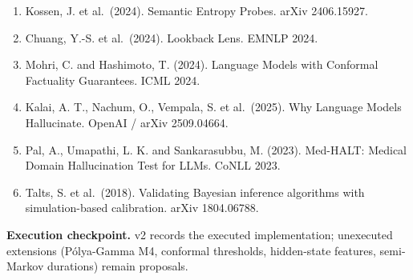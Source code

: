 \documentclass[11pt,letterpaper]{article}
\begin{document}
\begin{enumerate}[leftmargin=*]
\item Kossen, J. et al.\ (2024). Semantic Entropy Probes. arXiv 2406.15927.
\item Chuang, Y.-S. et al.\ (2024). Lookback Lens. EMNLP 2024.
\item Mohri, C. and Hashimoto, T. (2024). Language Models with Conformal Factuality Guarantees. ICML 2024.
\item Kalai, A. T., Nachum, O., Vempala, S. et al.\ (2025). Why Language Models Hallucinate. OpenAI / arXiv 2509.04664.
\item Pal, A., Umapathi, L. K. and Sankarasubbu, M. (2023). Med-HALT: Medical Domain Hallucination Test for LLMs. CoNLL 2023.
\item Talts, S. et al.\ (2018). Validating Bayesian inference algorithms with simulation-based calibration. arXiv 1804.06788.
\end{enumerate}
\textbf{Execution checkpoint.} v2 records the executed implementation; unexecuted extensions (P\'olya-Gamma M4, conformal thresholds, hidden-state features, semi-Markov durations) remain proposals.
\end{document}
